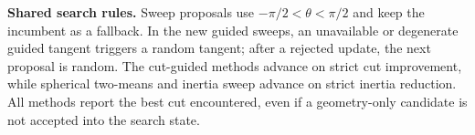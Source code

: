 \textbf{Shared search rules.} Sweep proposals use $-\pi/2<\theta<\pi/2$ and keep the incumbent as a fallback. In the new guided sweeps, an unavailable or degenerate guided tangent triggers a random tangent; after a rejected update, the next proposal is random. The cut-guided methods advance on strict cut improvement, while spherical two-means and inertia sweep advance on strict inertia reduction. All methods report the best cut encountered, even if a geometry-only candidate is not accepted into the search state.
